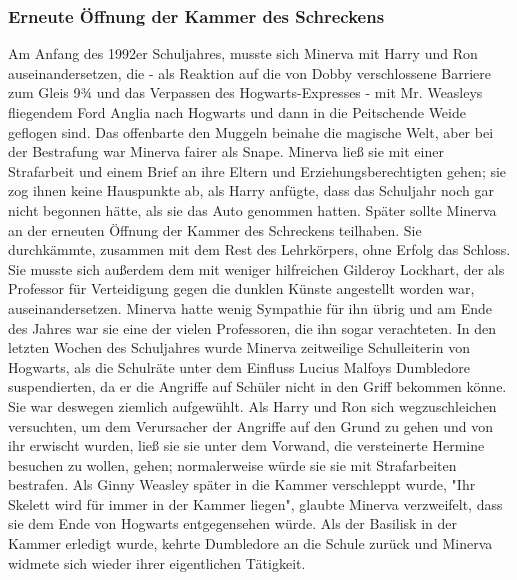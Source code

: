 \documentclass[a4paper, 10pt]{article}
\begin{document}
\subsubsection*{\large Erneute Öffnung der Kammer des Schreckens}
Am Anfang des 1992er Schuljahres, musste sich Minerva mit Harry und Ron auseinandersetzen, die - als Reaktion auf die von Dobby verschlossene Barriere zum Gleis 9¾ und das Verpassen des Hogwarts-Expresses - mit Mr. Weasleys fliegendem Ford Anglia nach Hogwarts und dann in die Peitschende Weide geflogen sind. Das offenbarte den Muggeln beinahe die magische Welt, aber bei der Bestrafung war Minerva fairer als Snape. Minerva ließ sie mit einer Strafarbeit und einem Brief an ihre Eltern und Erziehungsberechtigten gehen; sie zog ihnen keine Hauspunkte ab, als Harry anfügte, dass das Schuljahr noch gar nicht begonnen hätte, als sie das Auto genommen hatten.
\vspace{10pt}
\newline
{}  
Später sollte Minerva an der erneuten Öffnung der Kammer des Schreckens teilhaben. Sie durchkämmte, zusammen mit dem Rest des Lehrkörpers, ohne Erfolg das Schloss. Sie musste sich außerdem dem mit weniger hilfreichen Gilderoy Lockhart, der als Professor für Verteidigung gegen die dunklen Künste angestellt worden war, auseinandersetzen. Minerva hatte wenig Sympathie für ihn übrig und am Ende des Jahres war sie eine der vielen Professoren, die ihn sogar verachteten.
\vspace{10pt}
\newline
{}  
In den letzten Wochen des Schuljahres wurde Minerva zeitweilige Schulleiterin von Hogwarts, als die Schulräte unter dem Einfluss Lucius Malfoys Dumbledore suspendierten, da er die Angriffe auf Schüler nicht in den Griff bekommen könne. Sie war deswegen ziemlich aufgewühlt. Als Harry und Ron sich wegzuschleichen versuchten, um dem Verursacher der Angriffe auf den Grund zu gehen und von ihr erwischt wurden, ließ sie sie unter dem Vorwand, die versteinerte Hermine besuchen zu wollen, gehen; normalerweise würde sie sie mit Strafarbeiten bestrafen. Als Ginny Weasley später in die Kammer verschleppt wurde, "Ihr Skelett wird für immer in der Kammer liegen", glaubte Minerva verzweifelt, dass sie dem Ende von Hogwarts entgegensehen würde. Als der Basilisk in der Kammer erledigt wurde, kehrte Dumbledore an die Schule zurück und Minerva widmete sich wieder ihrer eigentlichen Tätigkeit.
\end{document}
